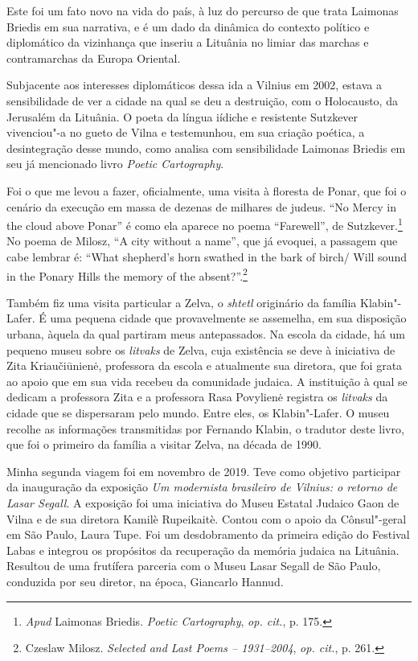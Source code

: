 Este foi um fato novo na vida do país, à luz do percurso de que trata
Laimonas Briedis em sua narrativa, e é um dado da dinâmica do contexto
político e diplomático da vizinhança que inseriu a Lituânia no limiar
das marchas e contramarchas da Europa Oriental.

Subjacente aos interesses diplomáticos dessa ida a Vilnius em 2002,
estava a sensibilidade de ver a cidade na qual se deu a destruição, com
o Holocausto, da Jerusalém da Lituânia. O poeta da língua iídiche e
resistente Sutzkever vivenciou"-a no gueto de Vilna e testemunhou, em sua
criação poética, a desintegração desse mundo, como analisa com
sensibilidade Laimonas Briedis em seu já mencionado livro \emph{Poetic
Cartography}.

Foi o que me levou a fazer, oficialmente, uma visita à floresta de
Ponar, que foi o cenário da execução em massa de dezenas de milhares de
judeus. ``No Mercy in the cloud above Ponar'' é como ela aparece no
poema ``Farewell'', de Sutzkever.\footnote{\emph{Apud} Laimonas Briedis.
  \emph{Poetic Cartography}, \emph{op. cit.}, p. 175.} No poema de
Milosz, ``A city without a name'', que já evoquei, a passagem que cabe
lembrar é: ``What shepherd's horn swathed in the bark of birch/ Will
sound in the Ponary Hills the memory of the absent?''.\footnote{Czeslaw
  Milosz. \emph{Selected and Last Poems -- 1931--2004}, \emph{op.
  cit.}, p. 261.}

Também fiz uma visita particular a Zelva, o \emph{shtetl} originário da
família Klabin"-Lafer. É uma pequena cidade que provavelmente se
assemelha, em sua disposição urbana, àquela da qual partiram meus
antepassados. Na escola da cidade, há um pequeno museu sobre os
\emph{litvaks} de Zelva, cuja existência se deve à iniciativa de Zita
Kriaučiūnienė, professora da escola e atualmente sua diretora, que foi
grata ao apoio que em sua vida recebeu da comunidade judaica. A
instituição à qual se dedicam a professora Zita e a professora Rasa
Povylienė registra os \emph{litvaks} da cidade que se dispersaram pelo
mundo. Entre eles, os Klabin"-Lafer. O museu recolhe as informações
transmitidas por Fernando Klabin, o tradutor deste livro, que foi o
primeiro da família a visitar Zelva, na década de 1990.

Minha segunda viagem foi em novembro de 2019. Teve como objetivo
participar da inauguração da exposição \emph{Um modernista brasileiro de
Vilnius: o retorno de Lasar Segall}. A exposição foi uma iniciativa do
Museu Estatal Judaico Gaon de Vilna e de sua diretora Kamilè Rupeikaitè.
Contou com o apoio da Cônsul"-geral em São Paulo, Laura Tupe. Foi um
desdobramento da primeira edição do Festival Labas e integrou os
propósitos da recuperação da memória judaica na Lituânia. Resultou de
uma frutífera parceria com o Museu Lasar Segall de São Paulo, conduzida
por seu diretor, na época, Giancarlo Hannud.

